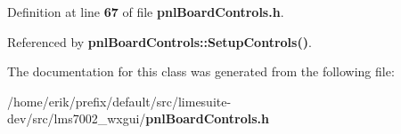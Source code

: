 Definition at line {\bf 67} of file {\bf pnl\+Board\+Controls.\+h}.



Referenced by {\bf pnl\+Board\+Controls\+::\+Setup\+Controls()}.



The documentation for this class was generated from the following file\+:\begin{DoxyCompactItemize}
\item 
/home/erik/prefix/default/src/limesuite-\/dev/src/lms7002\+\_\+wxgui/{\bf pnl\+Board\+Controls.\+h}\end{DoxyCompactItemize}
